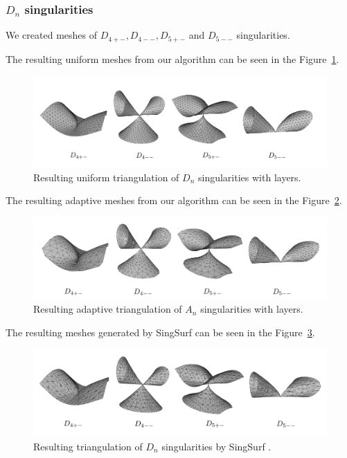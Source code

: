     \clearpage

    \subsubsection*{$D_{n}$ singularities}
    We created meshes of $D_{4+-}, D_{4--}, D_{5+-}$ and $D_{5--}$ singularities.

    The resulting uniform meshes from our algorithm can be seen in the 
    Figure~\ref{img:62}.
    \begin{figure}[h!]
        \centerline{\includegraphics[scale=0.5]{images/img62}}
        \caption[Resulting uniform triangulation of $D_{n}$ singularities]
        {Resulting uniform triangulation of $D_{n}$ singularities with layers.}
        \label{img:62}
    \end{figure}

    The resulting adaptive meshes from our algorithm can be seen in the 
    Figure~\ref{img:66}.
    \begin{figure}[h!]
        \centerline{\includegraphics[scale=0.5]{images/img66}}
        \caption[Resulting adaptive triangulation of $D_{n}$ singularities]
        {Resulting adaptive triangulation of $A_{n}$ singularities with layers.}
        \label{img:66}
    \end{figure}

    The resulting meshes generated by SingSurf 
    can be seen in the Figure~\ref{img:69}.
    \begin{figure}[h!]
        \centerline{\includegraphics[scale=0.5]{images/img69}}
        \caption[Resulting triangulation of $D_{n}$ singularities by SingSurf]
        {Resulting triangulation of $D_{n}$ singularities by SingSurf \cite{morris2003client}.}
        \label{img:69}
    \end{figure}

